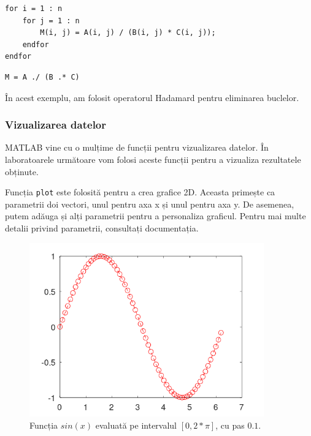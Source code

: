 \documentclass{exam}
\newcommand{\octavescript}[2]{
	
}
\begin{document}
\begin{lstlisting}
for i = 1 : n
	for j = 1 : n
		M(i, j) = A(i, j) / (B(i, j) * C(i, j));
	endfor
endfor
\end{lstlisting}

\begin{lstlisting}
M = A ./ (B .* C)
\end{lstlisting}

\par În acest exemplu, am folosit operatorul Hadamard pentru eliminarea buclelor.

\subsubsection{Vizualizarea datelor}

\par MATLAB vine cu o mulțime de funcții pentru vizualizarea datelor. În
laboratoarele următoare vom folosi aceste funcții pentru a vizualiza rezultatele
obținute.

\par Funcția \verb|plot| este folosită pentru a crea grafice 2D. Aceasta
primește ca parametrii doi vectori, unul pentru axa x și unul pentru axa y. De
asemenea, putem adăuga și alți parametrii pentru a personaliza graficul. Pentru
mai multe detalii privind parametrii, consultați documentația.

\octavescript{./src/plot1.m}{}

\begin{figure}[ht]
	\centering
	\includegraphics[width=0.9\textwidth]{plot1}
	\caption{Funcția $sin(x)$ evaluată pe intervalul $[0, 2 * \pi]$, cu pas $0.1$.}
\end{figure}
\end{document}
